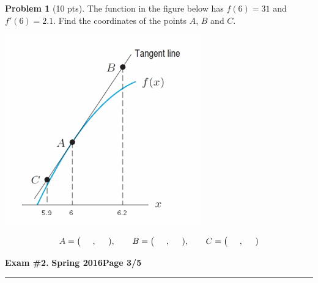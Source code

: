 \documentclass[12pt]{article}
\theoremstyle{definition}
\newtheorem{problem}{Problem}
\begin{document}
\begin{problem}[10 pts]
The function in the figure below has $f(6)=31$ and $f'(6)=2.1$. Find the coordinates of the points $A$, $B$ and $C$.
\begin{center}
\includegraphics[width=0.5\linewidth]{2graph.png}
\end{center}
\begin{equation*}
A = \big( \hspace{0.5cm}, \hspace{0.5cm} ), \qquad B = \big( \hspace{0.5cm}, \hspace{0.5cm} ), \qquad C = \big( \hspace{0.5cm}, \hspace{0.5cm})
\end{equation*}
\end{problem}


\newpage

\hfill{\large\bf Exam \#2.}\hfill{\large\bf
  Spring 2016}\hfill{\large\bf Page 3/5}\hrule

\bigskip
\end{document}
